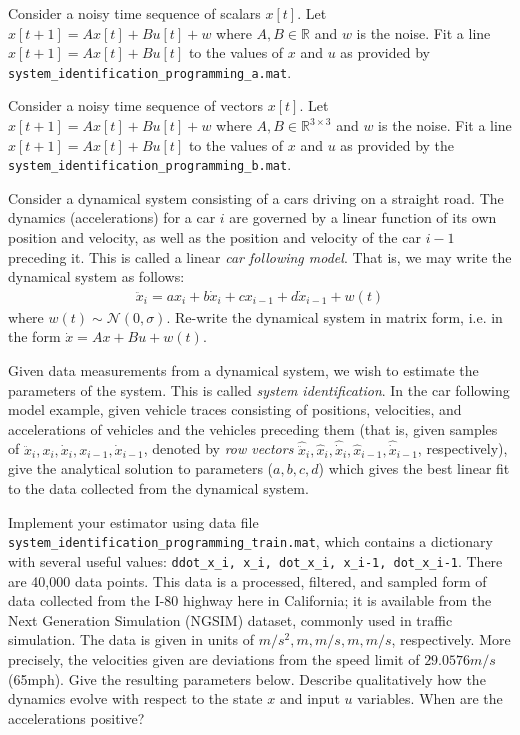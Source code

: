 \documentclass[11pt]{article}
\begin{document}
\begin{Parts}
		\Part Consider a noisy time sequence of scalars $x[t]$. Let $x[t+1] = A  x[t] + B u[t] + w$ where $A, B \in \mathbb{R}$ and $w$ is the noise. Fit a line $x[t+1] = Ax[t] + Bu[t]$ to the values of $x$ and $u$ as provided by \texttt{system\_identification\_programming\_a.mat}.
		
		

		\Part Consider a noisy time sequence of vectors $x[t]$. Let $x[t+1] = A  x[t] + B u[t] + w$ where $A, B \in \mathbb{R}^{3 \times 3}$ and $w$ is the noise. Fit a line $x[t+1] = Ax[t] + Bu[t]$ to the values of $x$ and $u$ as provided by the \texttt{system\_identification\_programming\_b.mat}.

		

	

		
		\Part Consider a dynamical system consisting of a cars driving on a straight road. The dynamics (accelerations) for a car $i$ are governed by a linear function of its own position and velocity, as well as the position and velocity of the car $i-1$ preceding it. This is called a linear \textit{car following model}. That is, we may write the dynamical system as follows:
		\begin{align*}
		\ddot{x}_i = a x_{i} + b \dot{x}_{i} + c x_{i-1} + d \dot{x}_{i-1} + w(t)
		\end{align*}
		where $w(t) \sim \mathcal{N}(0, \sigma)$. Re-write the dynamical system in matrix form, i.e. in the form $\dot{x} = Ax + Bu + w(t)$.

		

		\item Given data measurements from a dynamical system, we wish to estimate the parameters of the system. This is called \textit{system identification}. In the car following model example, given vehicle traces consisting of positions, velocities, and accelerations of vehicles and the vehicles preceding them (that is, given samples of $\ddot{x}_i, x_{i}, \dot{x}_{i}, x_{i-1}, \dot{x}_{i-1}$, denoted by \textit{row vectors} $\hat{\ddot{x}}_i, \hat{x}_{i}, \hat{\dot{x}}_{i}, \hat{x}_{i-1}, \hat{\dot{x}}_{i-1}$, respectively), give the analytical solution to parameters ($a, b, c, d$) which gives the best linear fit to the data collected from the dynamical system. 
		
		
		

		\Part Implement your estimator using data file \texttt{system\_identification\_programming\_train.mat}, which contains a dictionary with several useful values: \texttt{ddot\_x\_i, x\_i, dot\_x\_i, x\_i-1, dot\_x\_i-1}. There are 40,000 data points. This data is a processed, filtered, and sampled form of data collected from the I-80 highway here in California; it is available from the Next Generation Simulation (NGSIM) dataset, commonly used in traffic simulation. The data is given in units of $m/s^2, m, m/s, m, m/s$, respectively. More precisely, the velocities given are deviations from the speed limit of $29.0576 m/s$ (65mph). Give the resulting parameters below. Describe qualitatively how the dynamics evolve with respect to the state $x$ and input $u$ variables. When are the accelerations positive?
		

\end{Parts}
\end{document}

